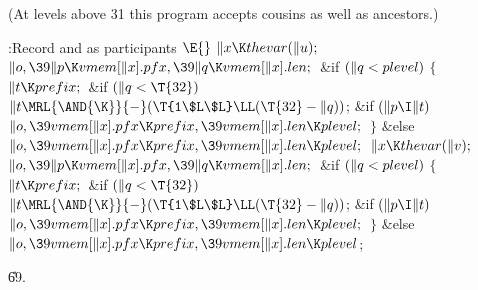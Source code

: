 (At levels above 31 this program accepts cousins as well as ancestors.)

\Y\B\4:Record  and  as participants%
\X${}\E{}$\6
$\|x\K\\{thevar}(\|u);{}$\6
${}\|o,\39\|p\K\\{vmem}[\|x].\\{pfx},\39\|q\K\\{vmem}[\|x].\\{len};{}$\6
\&{if} ${}(\|q<\\{plevel}){}$\5
${}\{{}$\1\6
${}\|t\K\\{prefix};{}$\6
\&{if} ${}(\|q<\T{32}){}$\1\5
${}\|t\MRL{\AND{\K}}{-}(\T{1\$L\$L}\LL(\T{32}-\|q)){}$;\2\6
\&{if} ${}(\|p\I\|t){}$\1\5
${}\|o,\39\\{vmem}[\|x].\\{pfx}\K\\{prefix},\39\\{vmem}[\|x].\\{len}\K%
\\{plevel};{}$\2\6
\4${}\}{}$\5
\2\&{else}\1\5
${}\|o,\39\\{vmem}[\|x].\\{pfx}\K\\{prefix},\39\\{vmem}[\|x].\\{len}\K%
\\{plevel};{}$\2\6
${}\|x\K\\{thevar}(\|v);{}$\6
${}\|o,\39\|p\K\\{vmem}[\|x].\\{pfx},\39\|q\K\\{vmem}[\|x].\\{len};{}$\6
\&{if} ${}(\|q<\\{plevel}){}$\5
${}\{{}$\1\6
${}\|t\K\\{prefix};{}$\6
\&{if} ${}(\|q<\T{32}){}$\1\5
${}\|t\MRL{\AND{\K}}{-}(\T{1\$L\$L}\LL(\T{32}-\|q)){}$;\2\6
\&{if} ${}(\|p\I\|t){}$\1\5
${}\|o,\39\\{vmem}[\|x].\\{pfx}\K\\{prefix},\39\\{vmem}[\|x].\\{len}\K%
\\{plevel};{}$\2\6
\4${}\}{}$\5
\2\&{else}\1\5
${}\|o,\39\\{vmem}[\|x].\\{pfx}\K\\{prefix},\39\\{vmem}[\|x].\\{len}\K%
\\{plevel}{}$;\2\par
\U69.\fi

